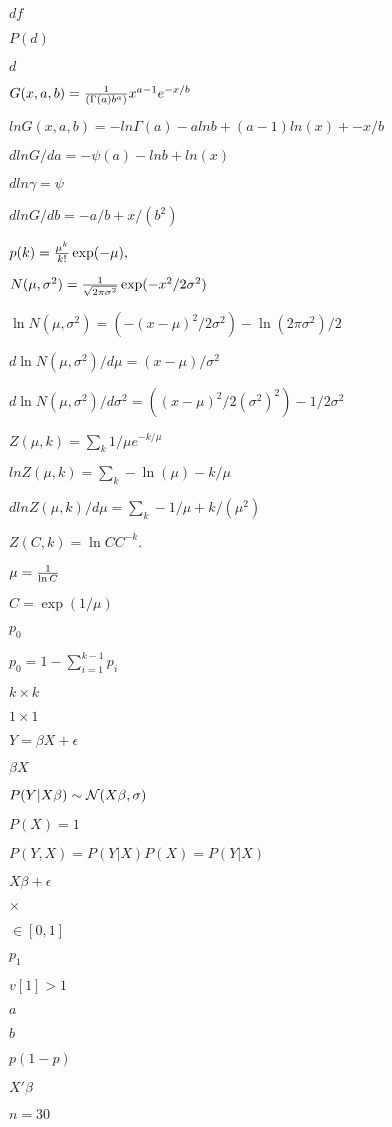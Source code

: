 \documentclass{article}
\begin{document}
$df$
\pagebreak

$P(d)$
\pagebreak

$d$
\pagebreak

$G(x, a, b) = {1\over (\Gamma(a) b^a)} x^{a-1} e^{-x/b}$
\pagebreak

$ln G(x, a, b)= -ln \Gamma(a) - a ln b + (a-1)ln(x) + -x/b$
\pagebreak

$d ln G/ da = -\psi(a) - ln b + ln(x) $
\pagebreak

$d ln \gamma = \psi$
\pagebreak

$d ln G/ db = -a/b + x/(b^2) $
\pagebreak

$p(k) = {\mu^k \over k!} \exp(-\mu), $
\pagebreak

$N(\mu,\sigma^2) = {1 \over \sqrt{2 \pi \sigma^2}} \exp (-x^2 / 2\sigma^2)$
\pagebreak

$\ln N(\mu,\sigma^2) = (-(x-\mu)^2 / 2\sigma^2) - \ln (2 \pi \sigma^2)/2 $
\pagebreak

$d\ln N(\mu,\sigma^2)/d\mu = (x-\mu) / \sigma^2 $
\pagebreak

$d\ln N(\mu,\sigma^2)/d\sigma^2 = ((x-\mu)^2 / 2(\sigma^2)^2) - 1/2\sigma^2 $
\pagebreak

$Z(\mu,k) = \sum_k 1/\mu e^{-k/\mu} $
\pagebreak

$ln Z(\mu,k) = \sum_k -\ln(\mu) - k/\mu $
\pagebreak

$dln Z(\mu,k)/d\mu = \sum_k -1/\mu + k/(\mu^2) $
\pagebreak

$Z(C,k) = \ln C C^{-k}. $
\pagebreak

$\mu = {1\over \ln C}$
\pagebreak

$C=\exp(1/\mu)$
\pagebreak

$p_0$
\pagebreak

$p_0=1-\sum_{i=1}^{k-1} p_i$
\pagebreak

$k \times k$
\pagebreak

$1\times 1$
\pagebreak

$ Y = \beta X + \epsilon$
\pagebreak

$\beta X$
\pagebreak

$P(Y|X\beta) \sim {\cal N}(X\beta, \sigma)$
\pagebreak

$P(X)=1$
\pagebreak

$P(Y, X) = P(Y|X)P(X) = P(Y|X)$
\pagebreak

$X\beta+\epsilon$
\pagebreak

$\times$
\pagebreak

$\in[0,1]$
\pagebreak

$p_1$
\pagebreak

$v[1]>1$
\pagebreak

$a$
\pagebreak

$b$
\pagebreak

$p(1-p)$
\pagebreak

$X'\beta$
\pagebreak

$n=30$
\pagebreak
\end{document}
